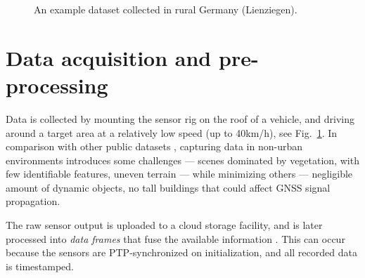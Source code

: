 \begin{figure}
	\centering
	\hspace{1pt}
	\caption[Example dataset trajectory]{An example dataset collected in rural Germany (Lienziegen).}
	\label{fig:example-trajectory}
\end{figure}


\section{Data acquisition and pre-processing}

Data is collected by mounting the sensor rig on the roof of a vehicle, and driving around a target area at a relatively low speed (\eg up to 40km/h), see Fig.~\ref{fig:example-trajectory}. In comparison with other public datasets \cite{nuscenes, pixset}, capturing data in non-urban environments introduces some challenges --- scenes dominated by vegetation, with few identifiable features, uneven terrain --- while minimizing others --- negligible amount of dynamic objects, no tall buildings that could affect GNSS signal propagation.

The raw sensor output is uploaded to a cloud storage facility, and is later processed into \emph{data frames} that fuse the available information . This can occur because the sensors are PTP-synchronized on initialization, and all recorded data is timestamped.


